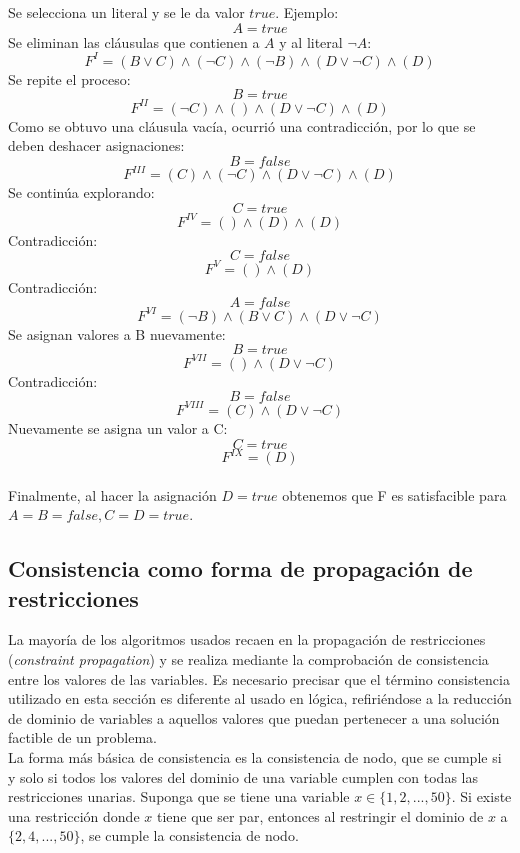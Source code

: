 \documentclass[12pt]{report}
\begin{document}
Se selecciona un literal y se le da valor $true$. Ejemplo:
$$A=true$$
Se eliminan las cláusulas que contienen a $A$ y al literal $\neg A$:
$$F^I=(B\lor C)\land(\neg C)\land(\neg B)\land(D\lor \neg C)\land(D)$$
Se repite el proceso:
$$B=true$$
$$F^{II}=(\neg C)\land()\land(D\lor \neg C)\land(D)$$
Como se obtuvo una cláusula vacía, ocurrió una contradicción, por lo que se deben deshacer asignaciones:
$$B=false$$
$$F^{III}=(C)\land(\neg C)\land(D\lor \neg C)\land(D)$$
Se continúa explorando:
$$C=true$$
$$F^{IV}=()\land(D)\land(D)$$
Contradicción:
$$C=false$$
$$F^{V}=()\land(D)$$
Contradicción:
$$A=false$$
$$F^{VI}=(\neg B)\land(B\lor C)\land(D\lor \neg C)$$
Se asignan valores a B nuevamente:
$$B=true$$
$$F^{VII}=()\land(D\lor \neg C)$$
Contradicción:
$$B=false$$
$$F^{VIII}=(C)\land(D\lor \neg C)$$
Nuevamente se asigna un valor a C:
$$C=true$$
$$F^{IX}=(D)$$\\

Finalmente, al hacer la asignación $D=true$ obtenemos que F es satisfacible para $A=B=false, C=D=true$.

\subsection{Consistencia como forma de propagación de restricciones}

La mayoría de los algoritmos usados recaen en la propagación de restricciones (\textit{constraint propagation}) y se realiza mediante la comprobación de consistencia entre los valores de las variables. Es necesario precisar que el término consistencia utilizado en esta sección es diferente al usado en lógica, refiriéndose a la reducción de dominio de variables a aquellos valores que puedan pertenecer a una solución factible de un problema.\\

La forma más básica de consistencia es la consistencia de nodo, que se cumple si y solo si todos los valores del dominio de una variable cumplen con todas las restricciones unarias. Suponga que se tiene una variable $x \in \{1,2,...,50\}$. Si existe una restricción donde $x$ tiene que ser par, entonces al restringir el dominio de $x$ a $\{2,4,...,50\}$, se cumple la consistencia de nodo.\\
\end{document}
